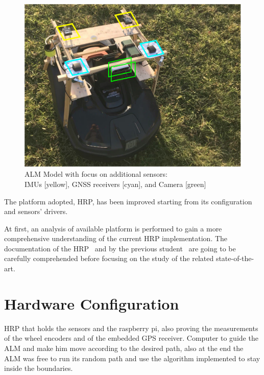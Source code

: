 \begin{figure}[!ht]
	\begin{center}
		\includegraphics[width=1.0\textwidth]{Images/1-Introduction/projectTheme.pdf}
		\caption{
			\gls{ALM} Model with focus on additional sensors:\\
		    \glspl{IMU} [yellow], \gls{GNSS} receivers [cyan], and Camera [green]
	\centering }
		\label{fig:HardwareSetup}
	\end{center}
\end{figure}


The platform adopted, \gls{HRP}, has been improved starting from its configuration and sensors' drivers.


At first, an analysis of available platform is performed to gain a more comprehensive understanding of the current \gls{HRP} implementation.
The documentation of the \gls{HRP}~\cite{HRP} and by the previous student~\cite{HRPTianze} are going to be carefully comprehended before focusing on the study of the related state-of-the-art.


\section{Hardware Configuration}
\label{sec:system}

\noindent
\gls{HRP} that holds the sensors and the raspberry pi, also proving the measurements of the wheel encoders and of the embedded GPS receiver.
Computer to guide the \gls{ALM} and make him move according to the desired path, also at the end the \gls{ALM} was free to run its random path and use the algorithm implemented to stay inside the boundaries.

